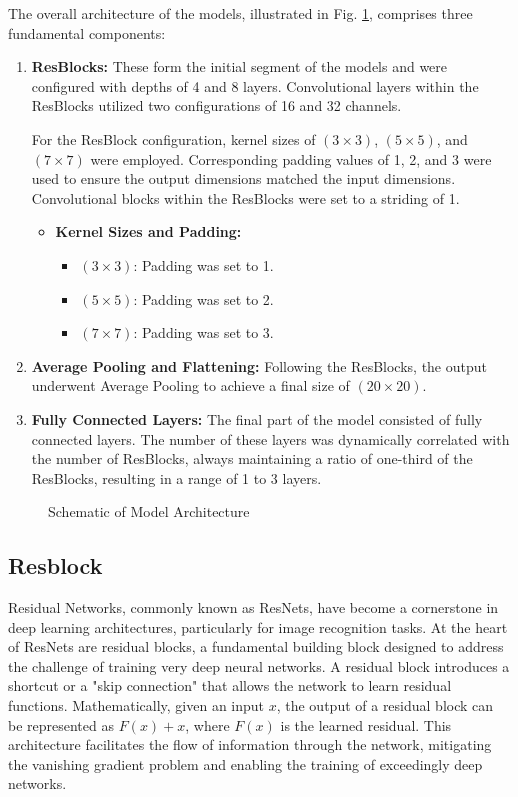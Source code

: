 The overall architecture of the models, illustrated in Fig. \ref{fig:resblock}, comprises three fundamental components:

\begin{enumerate}
	\item \textbf{ResBlocks:} These form the initial segment of the models and were configured with depths of 4 and 8 layers. Convolutional layers within the ResBlocks utilized two configurations of 16 and 32 channels.
	
	For the ResBlock configuration, kernel sizes of $(3 \times 3)$, $(5 \times 5)$, and $(7 \times 7)$ were employed. Corresponding padding values of 1, 2, and 3 were used to ensure the output dimensions matched the input dimensions. Convolutional blocks within the ResBlocks were set to a striding of 1.
	\begin{itemize}
		\item \textbf{Kernel Sizes and Padding:}
		\begin{itemize}
			\item $(3\times 3)$: Padding was set to 1.
			\item $(5\times 5)$: Padding was set to 2.
			\item $(7\times 7)$: Padding was set to 3.
		\end{itemize}
	\end{itemize}
	\item \textbf{Average Pooling and Flattening:} Following the ResBlocks, the output underwent Average Pooling to achieve a final size of $(20 \times 20)$.
	
	\item \textbf{Fully Connected Layers:} The final part of the model consisted of fully connected layers. The number of these layers was dynamically correlated with the number of ResBlocks, always maintaining a ratio of one-third of the ResBlocks, resulting in a range of 1 to 3 layers.
\end{enumerate}


\begin{figure}[h]
	\centering
	
	\caption{Schematic of Model Architecture}
	\label{fig:resblock}
\end{figure}

\subsection{Resblock}
Residual Networks, commonly known as ResNets, have become a cornerstone in deep learning architectures, particularly for image recognition tasks. At the heart of ResNets are residual blocks, a fundamental building block designed to address the challenge of training very deep neural networks\cite{he2016deep}. A residual block introduces a shortcut or a "skip connection" that allows the network to learn residual functions. Mathematically, given an input $x$, the output of a residual block can be represented as $F(x) + x$, where $F(x)$ is the learned residual. This architecture facilitates the flow of information through the network, mitigating the vanishing gradient problem and enabling the training of exceedingly deep networks. 

